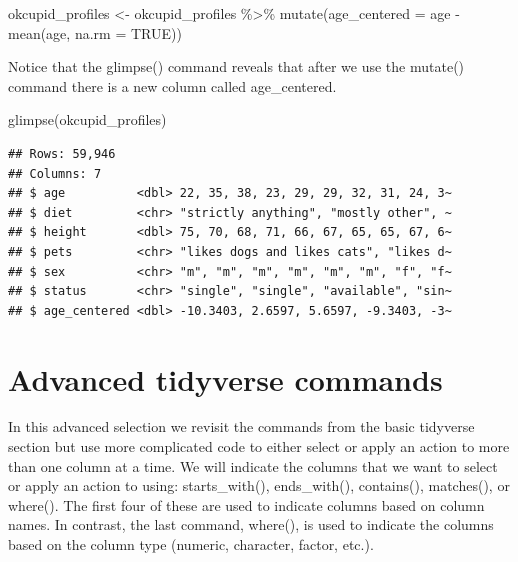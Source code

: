 \documentclass[
]{krantz}
\makeatletter
\newenvironment{Shaded}{\begin{snugshade}}{\end{snugshade}}
\newcommand{\AttributeTok}[1]{\textcolor[rgb]{0.61,0.61,0.61}{#1}}
\newcommand{\ConstantTok}[1]{\textcolor[rgb]{0,0,0}{#1}}
\newcommand{\FunctionTok}[1]{\textcolor[rgb]{0,0,0}{#1}}
\newcommand{\NormalTok}[1]{#1}
\newcommand{\OtherTok}[1]{\textcolor[rgb]{0.37,0.37,0.37}{#1}}
\newcommand{\SpecialCharTok}[1]{\textcolor[rgb]{0,0,0}{#1}}
\newenvironment{kframe}{%
\medskip{}
\setlength{\fboxsep}{.8em}
 \def\at@end@of@kframe{}%
 \ifinner\ifhmode%
  \def\at@end@of@kframe{\end{minipage}}%
  \begin{minipage}{\columnwidth}%
 \fi\fi%
 \def\FrameCommand##1{\hskip\@totalleftmargin \hskip-\fboxsep
 \colorbox{shadecolor}{##1}\hskip-\fboxsep
     \hskip-\linewidth \hskip-\@totalleftmargin \hskip\columnwidth}%
 \MakeFramed {\advance\hsize-\width
   \@totalleftmargin\z@ \linewidth\hsize
   \@setminipage}}%
 {\par\unskip\endMakeFramed%
 \at@end@of@kframe}
\renewenvironment{Shaded}{\begin{kframe}}{\end{kframe}}
\makeatother
\begin{document}
\begin{Shaded}
\begin{Highlighting}[]
\NormalTok{okcupid\_profiles }\OtherTok{\textless{}{-}}\NormalTok{ okcupid\_profiles }\SpecialCharTok{\%\textgreater{}\%}
  \FunctionTok{mutate}\NormalTok{(}\AttributeTok{age\_centered =}\NormalTok{ age }\SpecialCharTok{{-}} \FunctionTok{mean}\NormalTok{(age, }\AttributeTok{na.rm =} \ConstantTok{TRUE}\NormalTok{))}
\end{Highlighting}
\end{Shaded}

Notice that the glimpse() command reveals that after we use the mutate() command there is a new column called age\_centered.

\begin{Shaded}
\begin{Highlighting}[]
\FunctionTok{glimpse}\NormalTok{(okcupid\_profiles)}
\end{Highlighting}
\end{Shaded}

\begin{verbatim}
## Rows: 59,946
## Columns: 7
## $ age          <dbl> 22, 35, 38, 23, 29, 29, 32, 31, 24, 3~
## $ diet         <chr> "strictly anything", "mostly other", ~
## $ height       <dbl> 75, 70, 68, 71, 66, 67, 65, 65, 67, 6~
## $ pets         <chr> "likes dogs and likes cats", "likes d~
## $ sex          <chr> "m", "m", "m", "m", "m", "m", "f", "f~
## $ status       <chr> "single", "single", "available", "sin~
## $ age_centered <dbl> -10.3403, 2.6597, 5.6597, -9.3403, -3~
\end{verbatim}

\hypertarget{advanced-tidyverse-commands}{%
\section{Advanced tidyverse commands}\label{advanced-tidyverse-commands}}

In this advanced selection we revisit the commands from the basic tidyverse section but use more complicated code to either select or apply an action to more than one column at a time. We will indicate the columns that we want to select or apply an action to using: starts\_with(), ends\_with(), contains(), matches(), or where(). The first four of these are used to indicate columns based on column names. In contrast, the last command, where(), is used to indicate the columns based on the column type (numeric, character, factor, etc.).
\end{document}
